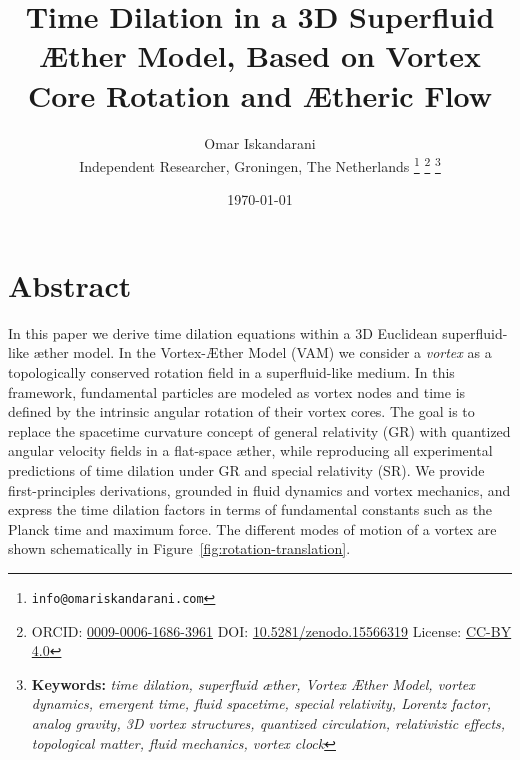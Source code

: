 \documentclass[a4paper,12pt]{article}
\begin{document}
\title{Time Dilation in a 3D Superfluid Æther Model, Based on Vortex Core Rotation and Ætheric Flow}
    \date{\today}
    \author{
        Omar Iskandarani\\
        \small Independent Researcher, Groningen, The Netherlands
        \thanks{\texttt{info@omariskandarani.com}}
        \thanks{ORCID: \href{https://orcid.org/0009-0006-1686-3961}{0009-0006-1686-3961} \quad DOI: \href{https://doi.org/10.5281/zenodo.15566319}{10.5281/zenodo.15566319} \quad License: \href{https://creativecommons.org/licenses/by/4.0/}{CC-BY 4.0}}
        \noindent\thanks{\textbf{Keywords:} \textit{time dilation, superfluid æther, Vortex Æther Model, vortex dynamics, emergent time, fluid spacetime, special relativity, Lorentz factor, analog gravity, 3D vortex structures, quantized circulation, relativistic effects, topological matter, fluid mechanics, vortex clock}}
    }
    \maketitle

\section*{Abstract}
In this paper we derive time dilation equations within a 3D Euclidean superfluid-like æther model. In the Vortex-Æther Model (VAM) we consider a \textit{vortex} as a topologically conserved rotation field in a superfluid-like medium. In this framework, fundamental particles are modeled as vortex nodes and time is defined by the intrinsic angular rotation of their vortex cores. The goal is to replace the spacetime curvature concept of general relativity (GR) with quantized angular velocity fields in a flat-space æther, while reproducing all experimental predictions of time dilation under GR and special relativity (SR). We provide first-principles derivations, grounded in fluid dynamics and vortex mechanics, and express the time dilation factors in terms of fundamental constants such as the Planck time and maximum force. The different modes of motion of a vortex are shown schematically in Figure~\ref{fig:rotation-translation}.
\end{document}
